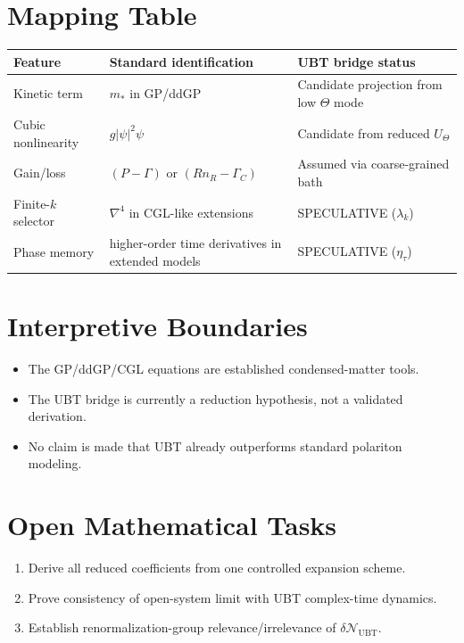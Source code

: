 \documentclass[11pt,a4paper]{article}
\begin{document}
\section{Mapping Table}
\begin{center}
\begin{tabular}{@{}lll@{}}
\toprule
Feature & Standard identification & UBT bridge status \\
\midrule
Kinetic term & $m_*$ in GP/ddGP & Candidate projection from low $\Theta$ mode \\
Cubic nonlinearity & $g|\psi|^2\psi$ & Candidate from reduced $U_\Theta$ \\
Gain/loss & $(P-\Gamma)$ or $(Rn_R-\Gamma_C)$ & Assumed via coarse-grained bath \\
Finite-$k$ selector & $\nabla^4$ in CGL-like extensions & SPECULATIVE ($\lambda_k$) \\
Phase memory & higher-order time derivatives in extended models & SPECULATIVE ($\eta_\tau$) \\
\bottomrule
\end{tabular}
\end{center}

\section{Interpretive Boundaries}
\begin{itemize}
\item The GP/ddGP/CGL equations are established condensed-matter tools.
\item The UBT bridge is currently a reduction hypothesis, not a validated derivation.
\item No claim is made that UBT already outperforms standard polariton modeling.
\end{itemize}

\section{Open Mathematical Tasks}
\begin{enumerate}
\item Derive all reduced coefficients from one controlled expansion scheme.
\item Prove consistency of open-system limit with UBT complex-time dynamics.
\item Establish renormalization-group relevance/irrelevance of $\delta\mathcal N_{\mathrm{UBT}}$.
\end{enumerate}
\end{document}
